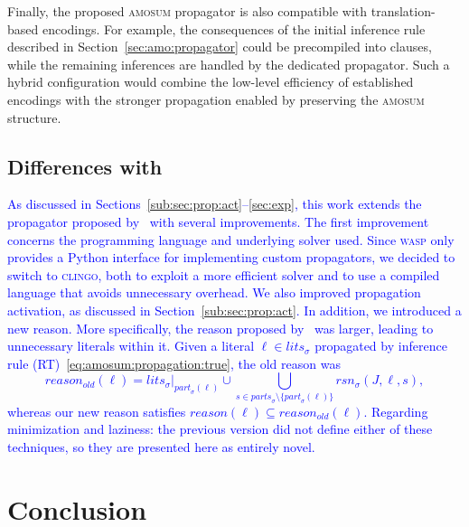 \documentclass[preprint,authoryear]{elsarticle}
\newcommand{\lits}{\mathit{lits}}
\theoremstyle{definition}
\begin{document}
{Finally, the proposed \textsc{amosum} propagator is also compatible with translation-based encodings. For example, the consequences of the initial inference rule described in Section~\ref{sec:amo:propagator} could be precompiled into clauses, while the remaining inferences are handled by the dedicated propagator. Such a hybrid configuration would combine the low-level efficiency of established encodings with the stronger propagation enabled by preserving the \textsc{amosum} structure.
}

\subsection{Differences with~\cite{DBLP:conf/ijcai/AlvianoDFM24}}

\textcolor{blue}{As discussed in Sections~\ref{sub:sec:prop:act}--\ref{sec:exp}, this work extends the propagator proposed by~\cite{DBLP:conf/ijcai/AlvianoDFM24} with several improvements.
The first improvement concerns the programming language and underlying solver used. Since \textsc{wasp} only provides a Python interface for implementing custom propagators, we decided to switch to \textsc{clingo}, both to exploit a more efficient solver and to use a compiled language that avoids unnecessary overhead.
We also improved propagation activation, as discussed in Section~\ref{sub:sec:prop:act}.
In addition, we introduced a new reason. More specifically, the reason proposed by~\cite{DBLP:conf/ijcai/AlvianoDFM24} was larger, leading to unnecessary literals within it.
Given a literal $\ell \in \lits_\sigma$ propagated by inference rule (RT)~\eqref{eq:amosum:propagation:true}, the old reason was
$$\mathit{reason_{old}}(\ell) = \lits_\sigma|_{\mathit{part}_\sigma(\ell)} \cup \bigcup_{s \in \mathit{parts}_\sigma \setminus \{\mathit{part}_\sigma(\ell)\}} \mathit{rsn}_\sigma(J,\ell,s),$$
whereas our new reason satisfies $\mathit{reason}(\ell) \subseteq \mathit{reason_{old}}(\ell)$.
Regarding minimization and laziness: the previous version did not define either of these techniques, so they are presented here as entirely novel.}

\section{Conclusion}\label{sec:conclusion}

\end{document}
